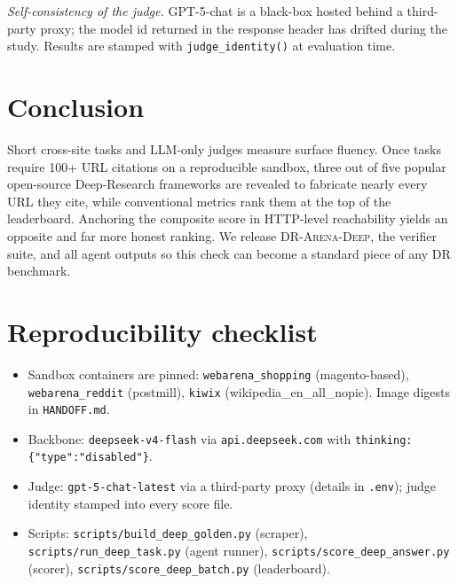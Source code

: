 \documentclass[11pt]{article}
\begin{document}
\emph{Self-consistency of the judge.} GPT-5-chat is a black-box
hosted behind a third-party proxy; the model id returned in the
response header has drifted during the study. Results are stamped
with \texttt{judge\_identity()} at evaluation time.

\section{Conclusion}

Short cross-site tasks and LLM-only judges measure surface fluency.
Once tasks require 100+ URL citations on a reproducible sandbox, three
out of five popular open-source Deep-Research frameworks are revealed
to fabricate nearly every URL they cite, while conventional metrics
rank them at the top of the leaderboard. Anchoring the composite score
in HTTP-level reachability yields an opposite and far more honest
ranking. We release \textsc{DR-Arena-Deep}, the verifier suite, and
all agent outputs so this check can become a standard piece of any
DR benchmark.




\appendix

\section{Reproducibility checklist}
\label{app:repro}

\begin{itemize}[leftmargin=*]
  \item Sandbox containers are pinned: \texttt{webarena\_shopping}
    (magento-based), \texttt{webarena\_reddit} (postmill), \texttt{kiwix}
    (wikipedia\_en\_all\_nopic). Image digests in
    \texttt{HANDOFF.md}.
  \item Backbone: \texttt{deepseek-v4-flash} via \texttt{api.deepseek.com}
    with \texttt{thinking:\{"type":"disabled"\}}.
  \item Judge: \texttt{gpt-5-chat-latest} via a third-party proxy
    (details in \texttt{.env}); judge identity stamped into every
    score file.
  \item Scripts: \texttt{scripts/build\_deep\_golden.py} (scraper),
    \texttt{scripts/run\_deep\_task.py} (agent runner),
    \texttt{scripts/score\_deep\_answer.py} (scorer),
    \texttt{scripts/score\_deep\_batch.py} (leaderboard).
\end{itemize}
\end{document}
